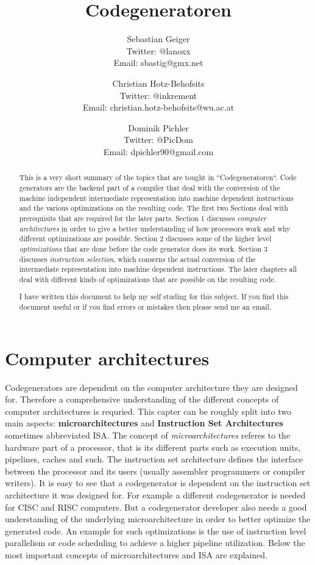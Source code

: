 \documentclass[a4paper,10pt]{article}
\title{Codegeneratoren}
\author{
Sebastian Geiger\\ \small{Twitter: @lanoxx} \\ \small{Email: sbastig@gmx.net}
\and
Christian Hotz-Behofsits\\ \small{Twitter: @inkrement} \\ \small{Email: christian.hotz-behofsits@wu.ac.at}
\and
Dominik Pichler\\ \small{Twitter: @PicDom} \\ \small{Email: dpichler90@gmail.com}
}
\begin{document}
\maketitle

\begin{abstract}
This is a very short summary of the topics that are tought in ``Codegeneratoren``. Code generators are the backend part of a compiler
that deal with the conversion of the machine independent intermediate representation into machine dependent instructions and the various
optimizations on the resulting code. The first two Sections deal with prerequisits that are required for the later parts. Section 1
discusses \textit{computer architectures} in order to give a better understanding of how processors work and why different optimizations
are possible. Section 2 discusses some of the higher level \textit{optimizations} that are done before the code generator does its work.
Section 3 discusses \textit{instruction selection}, which conserns the actual conversion of the intermediate representation into machine
dependent instructions. The later chapters all deal with different kinds of optimizations that are possible on the resulting code.

I have written this document to help my self studing for this subject. If you find this document useful or if you find errors or mistakes
then please send me an email.
\end{abstract}

\tableofcontents

\section{Computer architectures}
Codegenerators are dependent on the computer architecture they are designed for. Therefore a comprehensive understanding of the different
concepts of computer architectures is requried. This capter can be roughly split into two main aspects: \textbf{microarchitectures} and
\textbf{Instruction Set Architectures} sometimes abbreviated ISA. The concept of \textit{microarchitectures} referes to the hardware part
of a processor, that is its different parts such as execution units, pipelines, caches and such. The instruction set architecture defines
the interface between the processor and its users (usually assembler programmers or compiler writers). It is easy to see that a
codegenerator is dependent on the instruction set architecture it was designed for. For example a different codegenerator is needed for
CISC and RISC computers. But a codegenerator developer also needs a good understanding of the underlying microarchitecture in order to
better optimize the generated code. An example for such optimizations is the use of instruction level parallelism or code scheduling to
achieve a higher pipeline utilization. Below the most important concepts of microarchitectures and ISA are explained.
\end{document}
